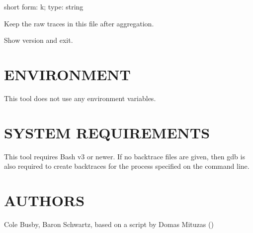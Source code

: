 \documentclass[letterpaper,10pt,english]{sphinxmanual}
\begin{document}
\begin{fulllineitems}
\label{\detokenize{mariadb-stacktrace:cmdoption-mariadb-stacktrace-save-samples}}
\sphinxAtStartPar
short form: \sphinxhyphen{}k; type: string

\sphinxAtStartPar
Keep the raw traces in this file after aggregation.

\end{fulllineitems}


\begin{fulllineitems}
\label{\detokenize{mariadb-stacktrace:cmdoption-mariadb-stacktrace-version}}
\sphinxAtStartPar
Show version and exit.

\end{fulllineitems}



\section{ENVIRONMENT}
\label{\detokenize{mariadb-stacktrace:environment}}
\sphinxAtStartPar
This tool does not use any environment variables.


\section{SYSTEM REQUIREMENTS}
\label{\detokenize{mariadb-stacktrace:system-requirements}}
\sphinxAtStartPar
This tool requires Bash v3 or newer.  If no backtrace files are given,
then gdb is also required to create backtraces for the process specified
on the command line.


\section{AUTHORS}
\label{\detokenize{mariadb-stacktrace:authors}}
\sphinxAtStartPar
Cole Busby, Baron Schwartz, based on a script by Domas Mituzas ()
\end{document}
